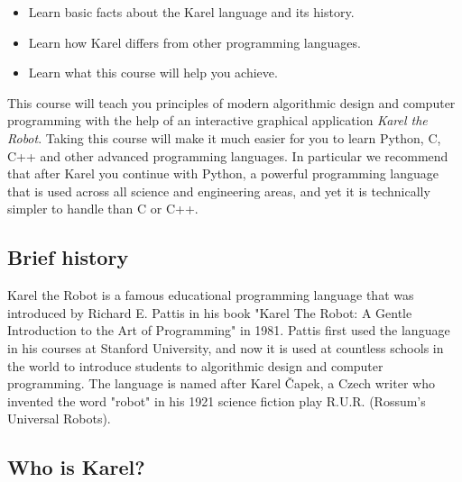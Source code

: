 \documentclass[article,A4,12pt]{llncs}
\begin{document}
\begin{itemize}
\item Learn basic facts about the Karel language and its history. 
\item Learn how Karel differs from other programming languages.
\item Learn what this course will help you achieve.
\end{itemize}
This course will teach you principles of modern algorithmic design and  
computer programming with the help of an interactive graphical application 
{\em Karel the Robot}. Taking this course will make it much easier 
for you to learn Python, C, C++ and other advanced programming languages. In particular we 
recommend that after Karel you continue with Python, a powerful programming 
language that is used across all science and engineering areas, and yet it is 
technically simpler to handle than C or C++. 

\subsection{Brief history}

Karel the Robot is a famous educational programming language that was introduced by Richard E. 
Pattis in his book "Karel The Robot: A Gentle Introduction to the Art of Programming" in 1981. 
Pattis first used the language in his courses at Stanford University, and now it is used at 
countless schools in the world to introduce students to algorithmic design and computer programming. 
The language is named after Karel \v{C}apek, a Czech writer who invented the word "robot" in his 1921 
science fiction play R.U.R. (Rossum's Universal Robots).

\subsection{Who is Karel?}
\end{document}
